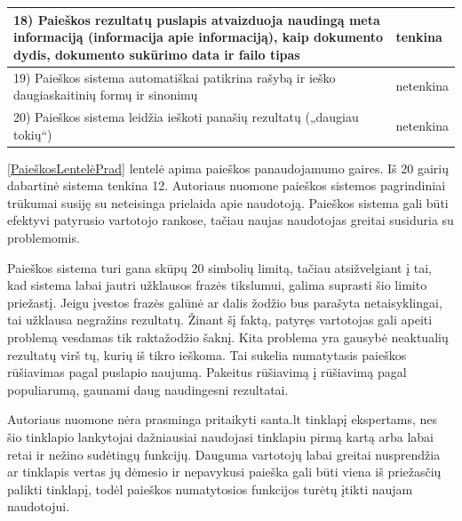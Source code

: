 \documentclass{VUMIFPSkursinis}
\begin{document}
\begin{center}
\begin{tabular}{ |p{}|p{2cm}| }
	18) Paieškos rezultatų puslapis atvaizduoja naudingą meta informaciją (informacija apie informaciją), kaip dokumento dydis, dokumento sukūrimo data ir failo tipas & tenkina \\ \hline
	19) Paieškos sistema automatiškai patikrina rašybą ir ieško daugiaskaitinių formų ir sinonimų & netenkina \\ \hline
	20) Paieškos sistema leidžia ieškoti panašių rezultatų („daugiau tokių“) & netenkina \\ \hline
\end{tabular}
\label{PaieškosLentelėPrad}
\end{center}

\pagebreak

\ref{PaieškosLentelėPrad} lentelė apima paieškos panaudojamumo gaires. Iš 20 gairių dabartinė sistema tenkina 12. Autoriaus nuomone paieškos sistemos pagrindiniai trūkumai susiję su neteisinga prielaida apie naudotoją. Paieškos sistema gali būti efektyvi patyrusio vartotojo rankose, tačiau naujas naudotojas greitai susiduria su problemomis.

Paieškos sistema turi gana skūpų 20 simbolių limitą, tačiau atsižvelgiant į tai, kad sistema labai jautri užklausos frazės tikslumui, galima suprasti šio limito priežastį. Jeigu įvestos frazės galūnė ar dalis žodžio bus parašyta netaisyklingai, tai užklausa negražins rezultatų. Žinant šį faktą, patyręs vartotojas gali apeiti problemą vesdamas tik raktažodžio šaknį.
Kita problema yra gausybė neaktualių rezultatų virš tų, kurių iš tikro ieškoma. Tai sukelia numatytasis paieškos rūšiavimas pagal puslapio naujumą. Pakeitus rūšiavimą į rūšiavimą pagal  populiarumą, gaunami daug naudingesni rezultatai.

Autoriaus nuomone nėra prasminga pritaikyti santa.lt tinklapį ekspertams, nes šio tinklapio lankytojai dažniausiai naudojasi tinklapiu pirmą kartą arba labai retai ir nežino sudėtingų funkcijų. Dauguma vartotojų labai greitai nusprendžia ar tinklapis vertas jų dėmesio\cite{WebBehaviorsEn} ir nepavykusi paieška gali būti viena iš priežasčių palikti tinklapį, todėl paieškos numatytosios funkcijos turėtų įtikti naujam naudotojui.
\end{document}
